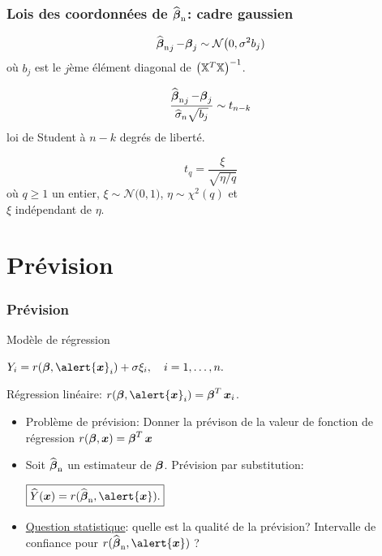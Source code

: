 \begin{frame}
\frametitle{Lois des coordonnées de $\operatorname{\widehat{\boldsymbol{\beta}}_n}$: cadre gaussien}
$$
\operatorname{\widehat{\boldsymbol{\beta}}_n}_j -\boldsymbol{\beta}_j \sim {\mathcal N}\big(0, \sigma^2 b_j)
$$
o\`u $b_j$ est le $j$ème élément diagonal de $\big(\mathbb{X}^T
\mathbb{X}\big)^{-1}$.

$$ \frac{\operatorname{\widehat{\boldsymbol{\beta}}_n}_j -\boldsymbol{\beta}_j}{\widehat \sigma_n \sqrt{b_j}} \sim t_{n-k}$$
\alert{loi de Student \`a $n-k$ degrés de liberté}.

$$ t_q = \frac{\xi}{\sqrt{\eta/q}}$$
o\`u $q\ge 1$ un entier, $\xi\sim {\mathcal N}\big(0,1)$, $\eta\sim
\chi^2(q)$ et\\ $\xi$ \alert{indépendant} de $\eta$.
\end{frame}



\section{Prévision}

\begin{frame}
\frametitle{Prévision}

Modèle de régression \vspace{2mm} \centerline{$ Y_i=
r(\truebeta, \alert{\bx}_i)+ \sigma \xi_i, \quad i=1,\dots,n.$}
Régression
\alert{linéaire}: $r(\truebeta, \alert{\bx}_i)=\truebeta^T
\bx_i$.
\begin{itemize}
\item \alert{Problème de prévision}:
Donner la prévison de la valeur de fonction de
régression $r(\boldsymbol{\beta},  \operatorname{\boldsymbol{x}})=\boldsymbol{\beta}^T \operatorname{\boldsymbol{x}}$\\
\item Soit $\operatorname{\widehat{\boldsymbol{\beta}}_n}$ un estimateur de $\boldsymbol{\beta}$. \alert{Prévision par
substitution:}
 \centerline{$\boxed{ \widehat Y(\bx) = r(\estregress, \alert{\bx}).}$}
\item \underline{Question statistique}: quelle est la qualité de la prévision?
\alert{Intervalle de confiance} pour $r(\estregress, \alert{\bx})$ ?
\end{itemize}
\end{frame}



